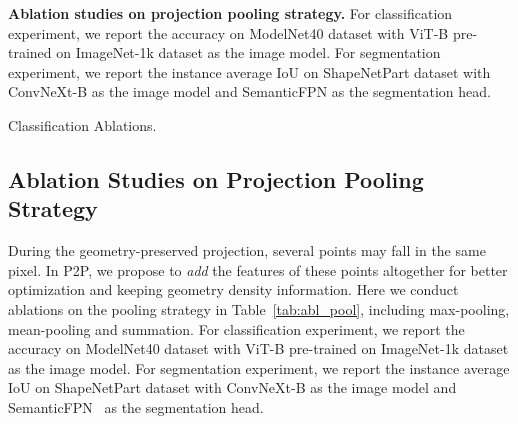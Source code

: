\documentclass{article}
\begin{document}
\begin{table}[t]
\caption{\small \textbf{Ablation studies on projection pooling strategy.} For classification experiment, we report the accuracy on ModelNet40 dataset with ViT-B pre-trained on ImageNet-1k dataset as the image model. For segmentation experiment, we report the instance average IoU on ShapeNetPart dataset with ConvNeXt-B as the image model and SemanticFPN as the segmentation head.} 
\label{tab:abl_pool}
\centering
\begin{subtable}{0.48\textwidth}
  \setlength\tabcolsep{4pt}
  \centering
  \caption{\footnotesize Classification Ablations.}
  \label{tab:abl_pool_cls}
 \end{subtable}
  \hfill
\begin{subtable}{0.48\textwidth}
  \setlength\tabcolsep{4pt}
  \centering
  \caption{\footnotesize Segmentation Ablations.}
  \label{tab:abl_pool_seg}
 \end{subtable}
\end{table}

\subsection{Ablation Studies on Projection Pooling Strategy}

During the geometry-preserved projection, several points may fall in the same pixel. In P2P, we propose to \textit{add} the features of these points altogether for better optimization and keeping geometry density information. Here we conduct ablations on the pooling strategy in Table~\ref{tab:abl_pool}, including max-pooling, mean-pooling and summation. For classification experiment, we report the accuracy on ModelNet40 dataset with ViT-B pre-trained on ImageNet-1k dataset as the image model. For segmentation experiment, we report the instance average IoU on ShapeNetPart dataset with ConvNeXt-B as the image model and SemanticFPN~\cite{kirillov2019semanticfpn} as the segmentation head.
\end{document}
